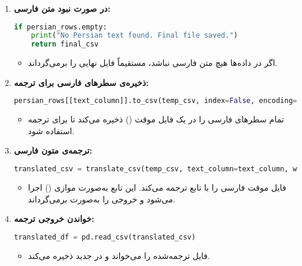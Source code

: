 \documentclass{article}
\begin{document}
\begin{enumerate}
    \item \textbf{در صورت نبود متن فارسی:}
    \begin{latin}
    \begin{lstlisting}[language=Python]
if persian_rows.empty:
    print("No Persian text found. Final file saved.")
    return final_csv
    \end{lstlisting}
    \end{latin}
    \begin{itemize}
        \item اگر در داده‌ها هیچ متن فارسی نباشد، مستقیماً فایل نهایی را برمی‌گرداند.
    \end{itemize}

    \item \textbf{ذخیره‌ی سطرهای فارسی برای ترجمه:}
    \begin{latin}
    \begin{lstlisting}[language=Python]
persian_rows[[text_column]].to_csv(temp_csv, index=False, encoding="utf-8-sig")
    \end{lstlisting}
    \end{latin}
    \begin{itemize}
        \item تمام سطرهای فارسی را در یک فایل موقت () ذخیره می‌کند تا برای ترجمه استفاده شود.
    \end{itemize}

    \item \textbf{ترجمه‌ی متون فارسی:}
    \begin{latin}
    \begin{lstlisting}[language=Python]
translated_csv = translate_csv(temp_csv, text_column=text_column, workers=workers)
    \end{lstlisting}
    \end{latin}
    \begin{itemize}
        \item فایل موقت فارسی را با تابع  ترجمه می‌کند. این تابع به‌صورت موازی () اجرا می‌شود و خروجی را به‌صورت  برمی‌گرداند.
    \end{itemize}

    \item \textbf{خواندن خروجی ترجمه:}
    \begin{latin}
    \begin{lstlisting}[language=Python]
translated_df = pd.read_csv(translated_csv)
    \end{lstlisting}
    \end{latin}
    \begin{itemize}
        \item فایل ترجمه‌شده را می‌خواند و در  جدید ذخیره می‌کند.
    \end{itemize}


\end{enumerate}
\end{document}

